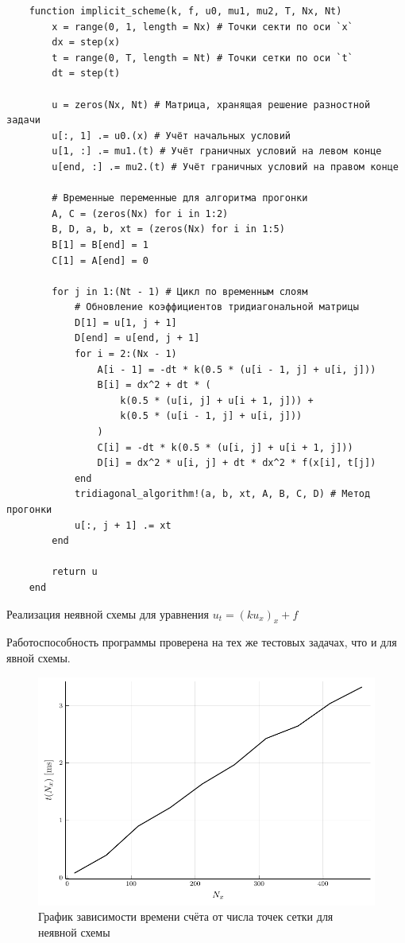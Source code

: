 \begin{listing}
    \begin{verbatim}
    function implicit_scheme(k, f, u0, mu1, mu2, T, Nx, Nt)
        x = range(0, 1, length = Nx) # Точки секти по оси `x`
        dx = step(x)
        t = range(0, T, length = Nt) # Точки сетки по оси `t`
        dt = step(t)
    
        u = zeros(Nx, Nt) # Матрица, хранящая решение разностной задачи
        u[:, 1] .= u0.(x) # Учёт начальных условий
        u[1, :] .= mu1.(t) # Учёт граничных условий на левом конце
        u[end, :] .= mu2.(t) # Учёт граничных условий на правом конце
    
        # Временные переменные для алгоритма прогонки
        A, C = (zeros(Nx) for i in 1:2)
        B, D, a, b, xt = (zeros(Nx) for i in 1:5)
        B[1] = B[end] = 1
        C[1] = A[end] = 0
    
        for j in 1:(Nt - 1) # Цикл по временным слоям
            # Обновление коэффициентов тридиагональной матрицы
            D[1] = u[1, j + 1]
            D[end] = u[end, j + 1]
            for i = 2:(Nx - 1)
                A[i - 1] = -dt * k(0.5 * (u[i - 1, j] + u[i, j]))
                B[i] = dx^2 + dt * (
                    k(0.5 * (u[i, j] + u[i + 1, j])) +
                    k(0.5 * (u[i - 1, j] + u[i, j]))
                )
                C[i] = -dt * k(0.5 * (u[i, j] + u[i + 1, j]))
                D[i] = dx^2 * u[i, j] + dt * dx^2 * f(x[i], t[j])
            end
            tridiagonal_algorithm!(a, b, xt, A, B, C, D) # Метод прогонки
            u[:, j + 1] .= xt
        end
    
        return u
    end
    \end{verbatim}
    \caption{Реализация неявной схемы для уравнения $u_t = (ku_x)_x + f$}
    \label{listing:implicit_scheme}
\end{listing}
Работоспособность программы проверена на тех же тестовых задачах, что и для явной схемы.
\begin{figure}
    \centering
    \includegraphics{Разностные_схемы_на_статических_сетках/Программный_код_примеры_расчётов/explicit_scheme/problem_1_implicit_time.pdf}
    \caption{График зависимости времени счёта от числа точек сетки для неявной схемы}
    \label{fig:problem_1_implicit_time}
\end{figure}
